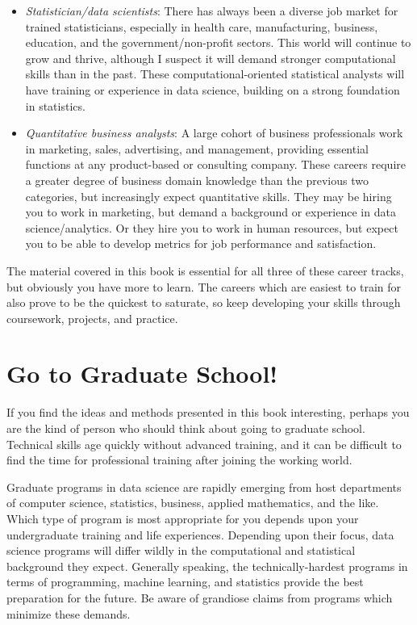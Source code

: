 \documentclass[10pt]{article}
\begin{document}
\begin{enumerate}
\begin{itemize}
  \item \textit{Statistician/data scientists}: There has always been a diverse job market for trained statisticians, especially in health care, manufacturing, business, education, and the government/non-profit sectors. This world will continue to grow and thrive, although I suspect it will demand stronger computational skills than in the past. These computational-oriented statistical analysts will have training or experience in data science, building on a strong foundation in statistics.

  \item \textit{Quantitative business analysts}: A large cohort of business professionals work in marketing, sales, advertising, and management, providing essential functions at any product-based or consulting company. These careers require a greater degree of business domain knowledge than the previous two categories, but increasingly expect quantitative skills. They may be hiring you to work in marketing, but demand a background or experience in data science/analytics. Or they hire you to work in human resources, but expect you to be able to develop metrics for job performance and satisfaction.
\end{itemize}

The material covered in this book is essential for all three of these career tracks, but obviously you have more to learn. The careers which are easiest to train for also prove to be the quickest to saturate, so keep developing your skills through coursework, projects, and practice.

\section{Go to Graduate School!}
If you find the ideas and methods presented in this book interesting, perhaps you are the kind of person who should think about going to graduate school. Technical skills age quickly without advanced training, and it can be difficult to find the time for professional training after joining the working world.

Graduate programs in data science are rapidly emerging from host departments of computer science, statistics, business, applied mathematics, and the like. Which type of program is most appropriate for you depends upon your undergraduate training and life experiences. Depending upon their focus, data science programs will differ wildly in the computational and statistical background they expect. Generally speaking, the technically-hardest programs in terms of programming, machine learning, and statistics provide the best preparation for the future. Be aware of grandiose claims from programs which minimize these demands.


\end{enumerate}
\end{document}
